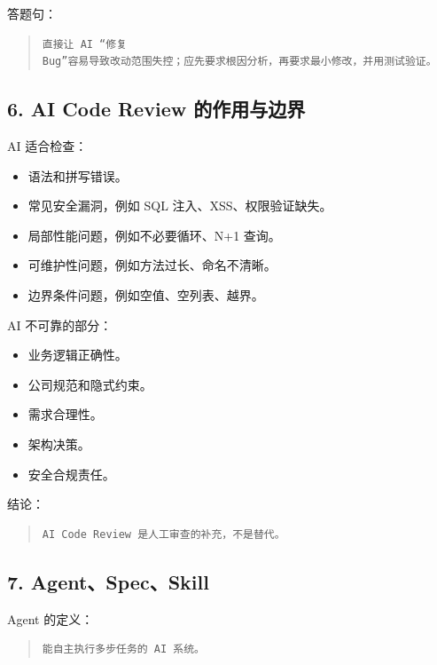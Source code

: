 \documentclass[UTF8,zihao=-4]{ctexart}
\begin{document}
答题句：

\begin{quote}
\footnotesize
\begin{verbatim}
直接让 AI “修复 
Bug”容易导致改动范围失控；应先要求根因分析，再要求最小修改，并用测试验证。
\end{verbatim}
\end{quote}

\subsection{6. AI Code Review 的作用与边界}

AI 适合检查：

\begin{itemize}
\item 语法和拼写错误。
\item 常见安全漏洞，例如 SQL 注入、XSS、权限验证缺失。
\item 局部性能问题，例如不必要循环、N+1 查询。
\item 可维护性问题，例如方法过长、命名不清晰。
\item 边界条件问题，例如空值、空列表、越界。
\end{itemize}

AI 不可靠的部分：

\begin{itemize}
\item 业务逻辑正确性。
\item 公司规范和隐式约束。
\item 需求合理性。
\item 架构决策。
\item 安全合规责任。
\end{itemize}

结论：

\begin{quote}
\footnotesize
\begin{verbatim}
AI Code Review 是人工审查的补充，不是替代。
\end{verbatim}
\end{quote}

\subsection{7. Agent、Spec、Skill}

Agent 的定义：

\begin{quote}
\footnotesize
\begin{verbatim}
能自主执行多步任务的 AI 系统。
\end{verbatim}
\end{quote}
\end{document}
